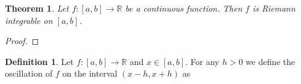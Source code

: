 \documentclass[12pt]{article}
\newtheorem{theorem}{Theorem}[section]
\theoremstyle{definition}
\newtheorem{definition}{Definition}[section]
\theoremstyle{definition}
\begin{document}
    \begin{theorem}
        Let $f:[a, b]\to\mathbb{R}$ be a continuous function. Then $f$ is
        Riemann integrable on $[a, b]$.
    \end{theorem}
        \begin{proof}
            
        \end{proof}
    \begin{definition}
        Let $f:[a, b]\to\mathbb{R}$ and $x\in[a, b]$. For any $h>0$ we define
        the oscillation of $f$ on the interval $(x-h, x+h)$ as 
    \end{definition}
\end{document}
